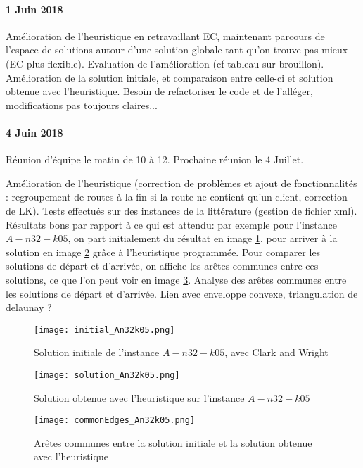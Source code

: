 \documentclass[a4paper,11pt]{article}%
\begin{document}
\paragraph*{1 Juin 2018}

Amélioration de l'heuristique en retravaillant EC, maintenant parcours de l'espace de solutions autour d'une solution globale tant qu'on trouve pas mieux (EC plus flexible). Evaluation de l'amélioration (cf tableau sur brouillon). Amélioration de la solution initiale, et comparaison entre celle-ci et solution obtenue avec l'heuristique. Besoin de refactoriser le code et de l'alléger, modifications pas toujours claires...

\paragraph*{4 Juin 2018}
Réunion d'équipe le matin de 10 à 12. Prochaine réunion le 4 Juillet.

Amélioration de l'heuristique (correction de problèmes et ajout de fonctionnalités : regroupement de routes à la fin si la route ne contient qu'un client, correction de LK). 
Tests effectués sur des instances de la littérature (gestion de fichier xml). Résultats bons par rapport à ce qui est attendu: par exemple pour l'instance $A-n32-k05$, on part initialement du résultat en image \ref{initial_An32k05}, pour arriver à la solution en image \ref{solution_An32k05} grâce à l'heuristique programmée. Pour comparer les solutions de départ et d'arrivée, on affiche les arêtes communes entre ces solutions, ce que l'on peut voir en image \ref{edges_An32k05}. Analyse des arêtes communes entre les solutions de départ et d'arrivée. Lien avec enveloppe convexe, triangulation de delaunay ? 

\begin{figure}[ht]
\centering
\texttt{[image: initial\_An32k05.png]}
	\caption{Solution initiale de l'instance $A-n32-k05$, avec Clark and Wright}
	\label{initial_An32k05}
\end{figure}

\begin{figure}[ht]
\centering
\texttt{[image: solution\_An32k05.png]}
	\caption{Solution obtenue avec l'heuristique sur l'instance $A-n32-k05$}
	\label{solution_An32k05}
\end{figure}

\begin{figure}[ht]
\centering
\texttt{[image: commonEdges\_An32k05.png]}
	\caption{Arêtes communes entre la solution initiale et la solution obtenue avec l'heuristique}
	\label{edges_An32k05}
\end{figure}
\end{document}
